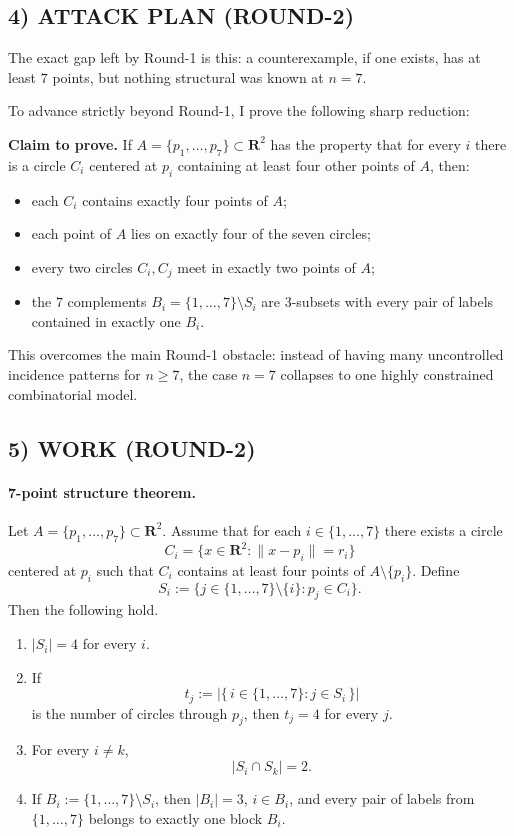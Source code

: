 \subsection*{4) ATTACK PLAN (ROUND-2)}

The exact gap left by Round-1 is this: a counterexample, if one exists, has at least $7$ points, but nothing structural was known at $n=7$.

To advance strictly beyond Round-1, I prove the following sharp reduction:

\medskip

\textbf{Claim to prove.} If $A=\{p_1,\dots,p_7\}\subset \mathbf{R}^2$ has the property that for every $i$ there is a circle $C_i$ centered at $p_i$ containing at least four other points of $A$, then:
\begin{itemize}
\item each $C_i$ contains exactly four points of $A$;
\item each point of $A$ lies on exactly four of the seven circles;
\item every two circles $C_i,C_j$ meet in exactly two points of $A$;
\item the $7$ complements $B_i=\{1,\dots,7\}\setminus S_i$ are $3$-subsets with every pair of labels contained in exactly one $B_i$.
\end{itemize}

This overcomes the main Round-1 obstacle: instead of having many uncontrolled incidence patterns for $n\ge 7$, the case $n=7$ collapses to one highly constrained combinatorial model.

\subsection*{5) WORK (ROUND-2)}

\paragraph{7-point structure theorem.}
Let $A=\{p_1,\dots,p_7\}\subset \mathbf{R}^2$. Assume that for each $i\in\{1,\dots,7\}$ there exists a circle
\[
C_i=\{x\in \mathbf{R}^2:\|x-p_i\|=r_i\}
\]
centered at $p_i$ such that $C_i$ contains at least four points of $A\setminus\{p_i\}$.
Define
\[
S_i:=\{j\in\{1,\dots,7\}\setminus\{i\}:p_j\in C_i\}.
\]
Then the following hold.

\begin{enumerate}
\item $|S_i|=4$ for every $i$.
\item If
\[
t_j:=|\{\,i\in\{1,\dots,7\}: j\in S_i\,\}|
\]
is the number of circles through $p_j$, then $t_j=4$ for every $j$.
\item For every $i\neq k$,
\[
|S_i\cap S_k|=2.
\]
\item If $B_i:=\{1,\dots,7\}\setminus S_i$, then $|B_i|=3$, $i\in B_i$, and every pair of labels from $\{1,\dots,7\}$ belongs to exactly one block $B_i$.
\end{enumerate}

